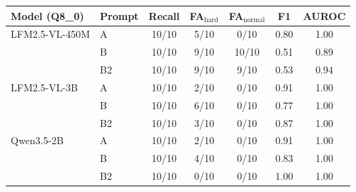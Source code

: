 \begin{tabular}{llccccc}
\toprule
Model (Q8\_0) & Prompt & Recall & FA$_\text{hard}$ & FA$_\text{normal}$ & F1 & AUROC \\
\midrule
LFM2.5-VL-450M & A & 10/10 & 5/10 & 0/10 & 0.80 & 1.00 \\
 & B & 10/10 & 9/10 & 10/10 & 0.51 & 0.89 \\
 & B2 & 10/10 & 9/10 & 9/10 & 0.53 & 0.94 \\
\midrule
LFM2.5-VL-3B & A & 10/10 & 2/10 & 0/10 & 0.91 & 1.00 \\
 & B & 10/10 & 6/10 & 0/10 & 0.77 & 1.00 \\
 & B2 & 10/10 & 3/10 & 0/10 & 0.87 & 1.00 \\
\midrule
Qwen3.5-2B & A & 10/10 & 2/10 & 0/10 & 0.91 & 1.00 \\
 & B & 10/10 & 4/10 & 0/10 & 0.83 & 1.00 \\
 & B2 & 10/10 & 0/10 & 0/10 & 1.00 & 1.00 \\
\bottomrule
\end{tabular}
